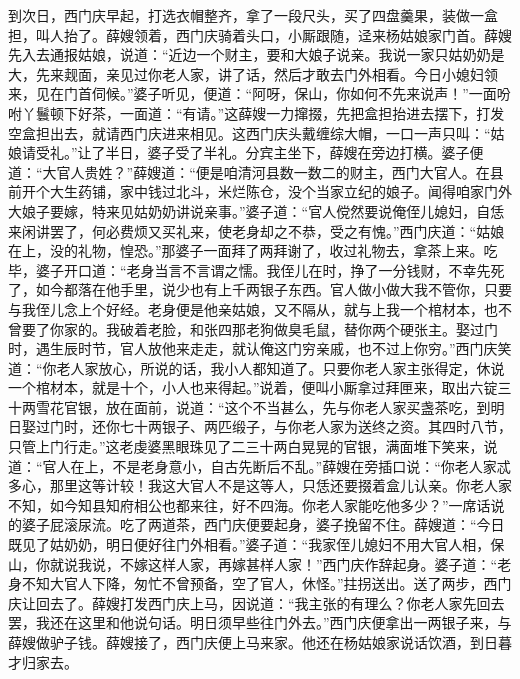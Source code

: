 到次日，西门庆早起，打选衣帽整齐，拿了一段尺头，买了四盘羹果，装做一盒担，叫人抬了。薛嫂领着，西门庆骑着头口，小厮跟随，迳来杨姑娘家门首。薛嫂先入去通报姑娘，说道：“近边一个财主，要和大娘子说亲。我说一家只姑奶奶是大，先来觌面，亲见过你老人家，讲了话，然后才敢去门外相看。今日小媳妇领来，见在门首伺候。”婆子听见，便道：“阿呀，保山，你如何不先来说声！”一面吩咐丫鬟顿下好茶，一面道：“有请。”这薛嫂一力撺掇，先把盒担抬进去摆下，打发空盒担出去，就请西门庆进来相见。这西门庆头戴缠综大帽，一口一声只叫：“姑娘请受礼。”让了半日，婆子受了半礼。分宾主坐下，薛嫂在旁边打横。婆子便道：“大官人贵姓？”薛嫂道：“便是咱清河县数一数二的财主，西门大官人。在县前开个大生药铺，家中钱过北斗，米烂陈仓，没个当家立纪的娘子。闻得咱家门外大娘子要嫁，特来见姑奶奶讲说亲事。”婆子道：“官人傥然要说俺侄儿媳妇，自恁来闲讲罢了，何必费烦又买礼来，使老身却之不恭，受之有愧。”西门庆道：“姑娘在上，没的礼物，惶恐。”那婆子一面拜了两拜谢了，收过礼物去，拿茶上来。吃毕，婆子开口道：“老身当言不言谓之懦。我侄儿在时，挣了一分钱财，不幸先死了，如今都落在他手里，说少也有上千两银子东西。官人做小做大我不管你，只要与我侄儿念上个好经。老身便是他亲姑娘，又不隔从，就与上我一个棺材本，也不曾要了你家的。我破着老脸，和张四那老狗做臭毛鼠，替你两个硬张主。娶过门时，遇生辰时节，官人放他来走走，就认俺这门穷亲戚，也不过上你穷。”西门庆笑道：“你老人家放心，所说的话，我小人都知道了。只要你老人家主张得定，休说一个棺材本，就是十个，小人也来得起。”说着，便叫小厮拿过拜匣来，取出六锭三十两雪花官银，放在面前，说道：“这个不当甚么，先与你老人家买盏茶吃，到明日娶过门时，还你七十两银子、两匹缎子，与你老人家为送终之资。其四时八节，只管上门行走。”这老虔婆黑眼珠见了二三十两白晃晃的官银，满面堆下笑来，说道：“官人在上，不是老身意小，自古先断后不乱。”薛嫂在旁插口说：“你老人家忒多心，那里这等计较！我这大官人不是这等人，只恁还要掇着盒儿认亲。你老人家不知，如今知县知府相公也都来往，好不四海。你老人家能吃他多少？”一席话说的婆子屁滚尿流。吃了两道茶，西门庆便要起身，婆子挽留不住。薛嫂道：“今日既见了姑奶奶，明日便好往门外相看。”婆子道：“我家侄儿媳妇不用大官人相，保山，你就说我说，不嫁这样人家，再嫁甚样人家！”西门庆作辞起身。婆子道：“老身不知大官人下降，匆忙不曾预备，空了官人，休怪。”拄拐送出。送了两步，西门庆让回去了。薛嫂打发西门庆上马，因说道：“我主张的有理么？你老人家先回去罢，我还在这里和他说句话。明日须早些往门外去。”西门庆便拿出一两银子来，与薛嫂做驴子钱。薛嫂接了，西门庆便上马来家。他还在杨姑娘家说话饮酒，到日暮才归家去。

